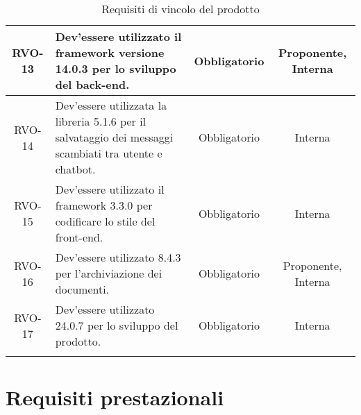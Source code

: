 \begin{xltabular}{\textwidth}{| c | X | c | c |}
    \hline
    RVO-13 & Dev'essere utilizzato il framework  versione 14.0.3 per lo sviluppo del back-end. & Obbligatorio & Proponente, Interna \\
    \hline
    RVO-14 & Dev'essere utilizzata la libreria  5.1.6 per il salvataggio dei messaggi scambiati tra utente e chatbot. & Obbligatorio & Interna \\
    \hline
    RVO-15 & Dev'essere utilizzato il framework  3.3.0 per codificare lo stile del front-end. & Obbligatorio & Interna \\
    \hline
    RVO-16 & Dev'essere utilizzato  8.4.3 per l'archiviazione dei documenti. & Obbligatorio & Proponente, Interna \\
    \hline
    RVO-17 & Dev'essere utilizzato  24.0.7 per lo sviluppo del prodotto. & Obbligatorio & Interna \\
    \hline
     \caption{Requisiti di vincolo del prodotto}
    \label{tab:reqvin}
\end{xltabular}
\endgroup

\section{Requisiti prestazionali}


